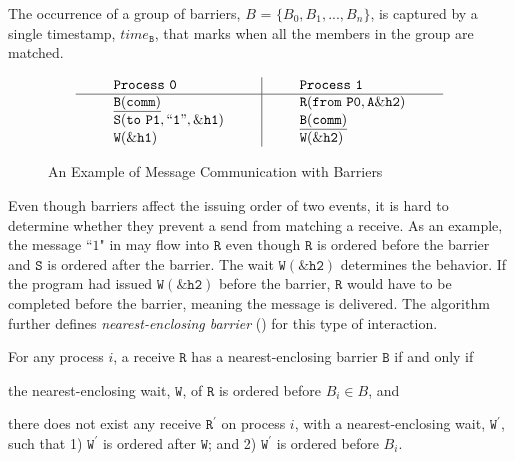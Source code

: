 \begin{definition}[Barrier]\label{def:barrier}
The occurrence of a group of barriers, $B$ = $\{B_0, B_1, ..., B_n\}$, is captured by a
single timestamp, $\mathit{time}_\mathtt{B}$, that marks when all the members in the group are matched.  
\end{definition}

\begin{figure}[h]
\[
\begin{array}{l|l}
\;\;\;\;\;\;\;\;\mathtt{Process\ 0}\;\;\;\;\;\;\;\; & \;\;\;\;\;\;\;\; \mathtt{Process\ 1}\;\;\;\;\;\;\;\; \\
\hline
\;\;\;\;\;\;\;\;\mathtt{\underline{B(comm)}}\;\;\;\;\;\;\;\; & \;\;\;\;\;\;\;\; \mathtt{R(from\ P0,A\&h2)}\;\;\;\;\;\;\;\; \\
\;\;\;\;\;\;\;\;\mathtt{S(to\ P1,``1",\&h1)}\;\;\;\;\;\;\;\; & \;\;\;\;\;\;\;\; \mathtt{\underline{B(comm)}}\;\;\;\;\;\;\;\; \\
\;\;\;\;\;\;\;\;\mathtt{W(\&h1)}\;\;\;\;\;\;\;\; & \;\;\;\;\;\;\;\; \mathtt{W(\&h2)}\;\;\;\;\;\;\;\; \\
\end{array}
\]
\caption{An Example of Message Communication with Barriers} \label{fig:mc_barrier1}
\end{figure}

Even though barriers affect the issuing order of two events, it is hard to determine whether they prevent a send from matching a receive. As an example, the message ``$1$" in  may flow into $\mathtt{R}$ even though $\mathtt{R}$ is ordered before the barrier and $\mathtt{S}$ is ordered after the barrier. The wait $\mathtt{W(\&h2)}$ determines the behavior. If the program had issued $\mathtt{W(\&h2)}$ before the barrier, $\mathtt{R}$ would have to be completed before the barrier, meaning the message is delivered. The algorithm further defines \textit{nearest-enclosing barrier} () for this type of interaction.

\begin{definition}\label{def:nb}
For any process $i$, a receive $\mathtt{R}$ has a nearest-enclosing barrier $\mathtt{B}$ if and only if
\begin{compactenum}
\item the nearest-enclosing wait, $\mathtt{W}$, of $\mathtt{R}$ is ordered before $B_i\in B$, and
\item there does not exist any receive $\mathtt{R^\prime}$ on process $i$, with a nearest-enclosing wait, $\mathtt{W^\prime}$, such that 1) $\mathtt{W^\prime}$ is ordered after $\mathtt{W}$; and 2) $\mathtt{W^\prime}$ is ordered before $B_i$.
\end{compactenum}
\end{definition}

